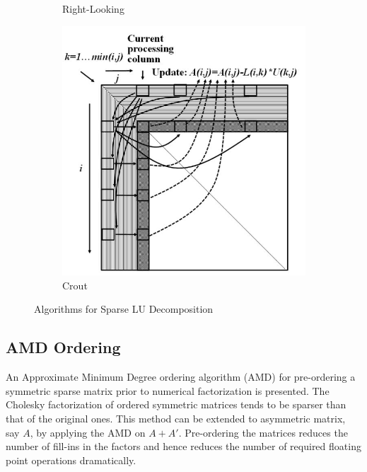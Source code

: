 \begin{figure}[H]
\begin{subfigure}[b]{0.33\textwidth}
        \caption{Right-Looking}
        \label{fig:LUD:rightLooking}
    \end{subfigure}%
    \begin{subfigure}[b]{0.33\textwidth}
        \includegraphics[width = 0.95\linewidth]{./Theory/crout.JPG}
        \caption{Crout}
        \label{fig:LUD:crout}
    \end{subfigure}
    \caption{Algorithms for Sparse LU Decomposition}
    \label{fig:LUD:algos}
\end{figure}

\subsection{AMD Ordering}
An Approximate Minimum Degree ordering algorithm (AMD) for
pre-ordering a symmetric sparse matrix prior to numerical factorization
is presented. The Cholesky factorization of ordered symmetric matrices tends to be 
sparser than that of the original ones. This method can be extended to asymmetric matrix, say $A$, by applying 
the AMD on $A + A'$. Pre-ordering the matrices reduces the number of fill-ins in the 
factors and hence reduces the number of required floating point operations dramatically.

